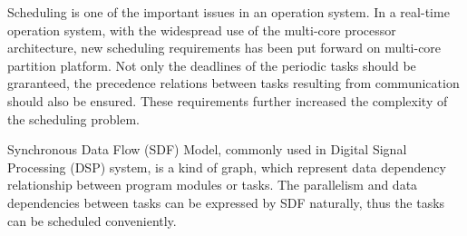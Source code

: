 \begin{eabstract}




Scheduling is one of the important issues  in an operation system. In a real-time operation system, with the widespread use of the multi-core processor architecture, new scheduling requirements has been put forward on multi-core partition platform.
Not only the deadlines of the periodic tasks should be graranteed, the precedence relations between tasks resulting from communication should also be ensured. These requirements further increased the complexity of the scheduling problem.


Synchronous Data Flow (SDF) Model, commonly used in Digital Signal Processing (DSP) system, is a kind of graph, which represent data dependency relationship between program modules or tasks. The parallelism and data dependencies between tasks can be expressed by SDF naturally, thus the tasks can be scheduled conveniently.


\end{eabstract}
